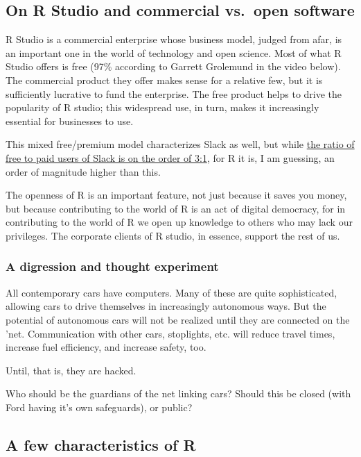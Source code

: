 \documentclass[]{book}
\theoremstyle{definition}
\theoremstyle{definition}
\theoremstyle{definition}
\theoremstyle{remark}
\begin{document}
\subsection{On R Studio and commercial vs.~open
software}\label{on-r-studio-and-commercial-vs.open-software}

R Studio is a commercial enterprise whose business model, judged from
afar, is an important one in the world of technology and open science.
Most of what R Studio offers is free (97\% according to Garrett
Grolemund in the video below). The commercial product they offer makes
sense for a relative few, but it is sufficiently lucrative to fund the
enterprise. The free product helps to drive the popularity of R studio;
this widespread use, in turn, makes it increasingly essential for
businesses to use.

This mixed free/premium model characterizes Slack as well, but while
\href{https://www.statista.com/statistics/652779/worldwide-slack-users-total-vs-paid/}{the
ratio of free to paid users of Slack is on the order of 3:1}, for R it
is, I am guessing, an order of magnitude higher than this.

The openness of R is an important feature, not just because it saves you
money, but because contributing to the world of R is an act of digital
democracy, for in contributing to the world of R we open up knowledge to
others who may lack our privileges. The corporate clients of R studio,
in essence, support the rest of us.

\subsubsection{A digression and thought
experiment}\label{a-digression-and-thought-experiment}

All contemporary cars have computers. Many of these are quite
sophisticated, allowing cars to drive themselves in increasingly
autonomous ways. But the potential of autonomous cars will not be
realized until they are connected on the 'net. Communication with other
cars, stoplights, etc. will reduce travel times, increase fuel
efficiency, and increase safety, too.

Until, that is, they are hacked.

Who should be the guardians of the net linking cars? Should this be
closed (with Ford having it's own safeguards), or public?

\subsection{A few characteristics of
R}\label{a-few-characteristics-of-r}
\end{document}
